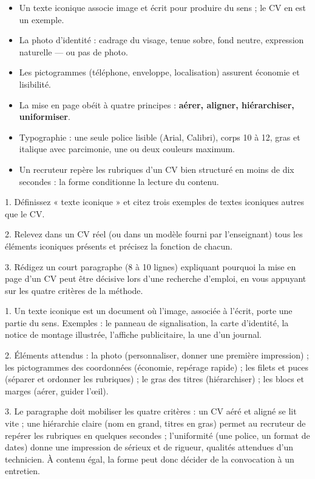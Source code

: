 \documentclass[11pt]{article}
\newcommand{\cle}[1]{{\popxbold\color{popdark}#1}}
\begin{document}
\begin{aretenir}
\begin{itemize}
\item Un \cle{texte iconique} associe image et écrit pour produire du sens ; le CV en est un exemple.
\item La photo d'identité : cadrage du visage, tenue sobre, fond neutre, expression naturelle — ou pas de photo.
\item Les pictogrammes (téléphone, enveloppe, localisation) assurent économie et lisibilité.
\item La mise en page obéit à quatre principes : \textbf{aérer, aligner, hiérarchiser, uniformiser}.
\item Typographie : une seule police lisible (Arial, Calibri), corps 10 à 12, gras et italique avec parcimonie, une ou deux couleurs maximum.
\item Un recruteur repère les rubriques d'un CV bien structuré en moins de dix secondes : la forme conditionne la lecture du contenu.
\end{itemize}
\end{aretenir}

\begin{exercice}
1. Définissez « texte iconique » et citez trois exemples de textes iconiques autres que le CV.

2. Relevez dans un CV réel (ou dans un modèle fourni par l'enseignant) tous les éléments iconiques présents et précisez la fonction de chacun.

3. Rédigez un court paragraphe (8 à 10 lignes) expliquant pourquoi la mise en page d'un CV peut être décisive lors d'une recherche d'emploi, en vous appuyant sur les quatre critères de la méthode.
\end{exercice}

\begin{corrige}[Exercice]
1. Un texte iconique est un document où l'image, associée à l'écrit, porte une partie du sens. Exemples : le panneau de signalisation, la carte d'identité, la notice de montage illustrée, l'affiche publicitaire, la une d'un journal.

2. Éléments attendus : la photo (personnaliser, donner une première impression) ; les pictogrammes des coordonnées (économie, repérage rapide) ; les filets et puces (séparer et ordonner les rubriques) ; le gras des titres (hiérarchiser) ; les blocs et marges (aérer, guider l'œil).

3. Le paragraphe doit mobiliser les quatre critères : un CV aéré et aligné se lit vite ; une hiérarchie claire (nom en grand, titres en gras) permet au recruteur de repérer les rubriques en quelques secondes ; l'uniformité (une police, un format de dates) donne une impression de sérieux et de rigueur, qualités attendues d'un technicien. À contenu égal, la forme peut donc décider de la convocation à un entretien.
\end{corrige}
\end{document}
